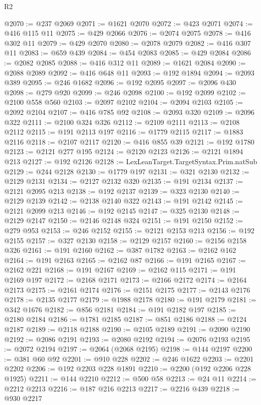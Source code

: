 \begin{lexlean}{R2}
\begin{coremodule}
@2070 := @237 @2069
@2071 := @1621 @2070
@2072 := @423 @2071
@2074 := @416 @115 @11
@2075 := @429 @2066
@2076 := @2074 @2075
@2078 := @416 @302 @11
@2079 := @429 @2070
@2080 := @2078 @2079
@2082 := @416 @307 @11
@2083 := @659 @439
@2084 := @454 @2083
@2085 := @429 @2084
@2086 := @2082 @2085
@2088 := @416 @312 @11
@2089 := @1621 @2084
@2090 := @2088 @2089
@2092 := @416 @648 @11
@2093 := @192 @1894
@2094 := @2093 @389
@2095 := @246 @1682
@2096 := @192 @2095
@2097 := @2096 @430
@2098 := @279 @920
@2099 := @246 @2098
@2100 := @192 @2099
@2102 := @2100 @558 @560
@2103 := @2097 @2102
@2104 := @2094 @2103
@2105 := @2092 @2104
@2107 := @416 @785 @92
@2108 := @2093 @320
@2109 := @2096 @322
@2111 := @2100 @324 @326
@2112 := @2109 @2111
@2113 := @2108 @2112
@2115 := @191 @2113 @197
@2116 := @1779 @2115
@2117 := @1883 @2116
@2118 := @2107 @2117
@2120 := @416 @855 @39
@2121 := @192 @1780
@2123 := @2121 @277 @195
@2124 := @2120 @2123
@2126 := @2121 @1894 @213
@2127 := @192 @2126
@2128 := LexLeanTarget.TargetSyntax.Prim.natSub
@2129 := @244 @2128
@2130 := @1779 @197
@2131 := @321 @2130
@2132 := @2129 @2131
@2134 := @2127 @2132 @320
@2135 := @191 @2134
@2137 := @2121 @2095 @213
@2138 := @192 @2137
@2139 := @323 @2130
@2140 := @2129 @2139
@2142 := @2138 @2140 @322
@2143 := @191 @2142
@2145 := @2121 @2099 @213
@2146 := @192 @2145
@2147 := @325 @2130
@2148 := @2129 @2147
@2150 := @2146 @2148 @324
@2151 := @191 @2150
@2152 := @279 @953
@2153 := @246 @2152
@2155 := @2121 @2153 @213
@2156 := @192 @2155
@2157 := @327 @2130
@2158 := @2129 @2157
@2160 := @2156 @2158 @326
@2161 := @191 @2160
@2162 := @387 @1782
@2163 := @2162 @162
@2164 := @191 @2163
@2165 := @2162 @87
@2166 := @191 @2165
@2167 := @2162 @221
@2168 := @191 @2167
@2169 := @2162 @115
@2171 := @191 @2169 @197
@2172 := @2168 @2171
@2173 := @2166 @2172
@2174 := @2164 @2173
@2175 := @2161 @2174
@2176 := @2151 @2175
@2177 := @2143 @2176
@2178 := @2135 @2177
@2179 := @1988 @2178
@2180 := @191 @2179
@2181 := @342 @1676
@2182 := @856 @2181
@2184 := @191 @2182 @197
@2185 := @2180 @2184
@2186 := @1781 @2185
@2187 := @851 @2186
@2188 := @2124 @2187
@2189 := @2118 @2188
@2190 := @2105 @2189
@2191 := @2090 @2190
@2192 := @2086 @2191
@2193 := @2080 @2192
@2194 := @2076 @2193
@2195 := @2072 @2194
@2197 := @2064 (@2068 @2195)
@2198 := @144 @2197
@2200 := @381 @60 @92
@2201 := @910 @228
@2202 := @246 @1622
@2203 := @2201 @2202
@2206 := @192 @2203 @228 @1891
@2210 := @2200 (@192 @2206 @228 @1925)
@2211 := @144 @2210
@2212 := @500 @58
@2213 := @24 @11
@2214 := @2212 @2213
@2216 := @187 @216 @2213
@2217 := @2216 @439
@2218 := @930 @2217

\end{coremodule}
\end{lexlean}
